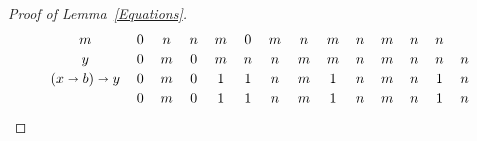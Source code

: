 \documentclass[reqno,a4paper]{amsart}
\theoremstyle{remark}
\theoremstyle{definition}
\newcommand{\iimplies}{\shortrightarrow}
\begin{document}
\begin{proof}[Proof of Lemma~\ref{Equations}]
\begin{table}
\[\begin{tabular}{c c c c c c c c c c c c c c}
				\(m\)                         & \(0\) & \(n\) & \(n\) & \(m\) & \(0\) & \(m\) & \(n\) & \(m\) & \(n\) & \(m\) & \(n\) & \(n\) \\[2pt]
				\(y\)                         &
				\(0\)                         & \(m\) & \(0\) & \(m\) & \(n\) & \(n\) & \(m\) & \(m\) & \(n\) & \(m\) & \(n\) & \(n\) & \(n\) \\[2pt]
				\((x\iimplies b)\iimplies y\) &
				\(0\)                         & \(m\) & \(0\) & \(1\) & \(1\) & \(n\) & \(m\) & \(1\) & \(n\) & \(m\) & \(n\) & \(1\) & \(n\) \\[2pt]
				                              &
				\(0\)                         & \(m\) & \(0\) & \(1\) & \(1\) & \(n\) & \(m\) & \(1\) & \(n\) & \(m\) & \(n\) & \(1\) & \(n\) \\
			\end{tabular}
		\]
		\caption{Identity (6) of Lemma~\ref{Equations}; here the last line represents \((((b \lhd  x) \iimplies (b \vee y))\iimplies (b \vee y)) \wedge ((b \vee y) \iimplies (b\lhd y))\)}\label{Table 4}
	\end{table}
\end{proof}


{}

\end{document}
